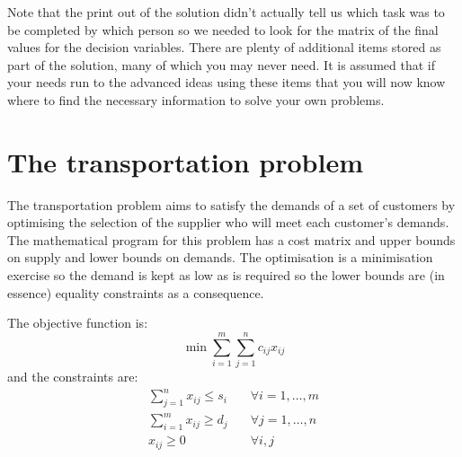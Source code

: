 Note that the print out of the solution didn't actually tell us which task was to be completed by which person so we needed to look for the matrix of the final values for the decision variables. There are plenty of additional items stored as part of the solution, many of which you may never need. It is assumed that if your needs run to the advanced ideas using these items that you will now know where to find the necessary information to solve your own problems.

\section{The transportation problem}

The transportation problem aims to satisfy the demands of a set of customers by optimising the selection of the supplier who will meet each customer's demands. The mathematical program for this problem has a cost matrix and upper bounds on supply and lower bounds on demands. The optimisation is a minimisation exercise so the demand is kept as low as is required so the lower bounds are (in essence) equality constraints as a consequence.

The objective function is:\begin{equation}\label{OperResTransObj}
\min{ \sum_{i=1}^m{ \sum_{j=1}^n{
c_{ij}x_{ij}
}}}\end{equation}
and the constraints are:
\begin{eqnarray*} \sum_{j=1}^n { x_{ij}} \le s_i& \quad \forall i=1,\ldots,m\\
\sum_{i=1}^m { x_{ij}} \ge d_j& \quad \forall j=1,\ldots,n\\
x_{ij} \ge 0& \quad \forall i,j\\
\end{eqnarray*} 


